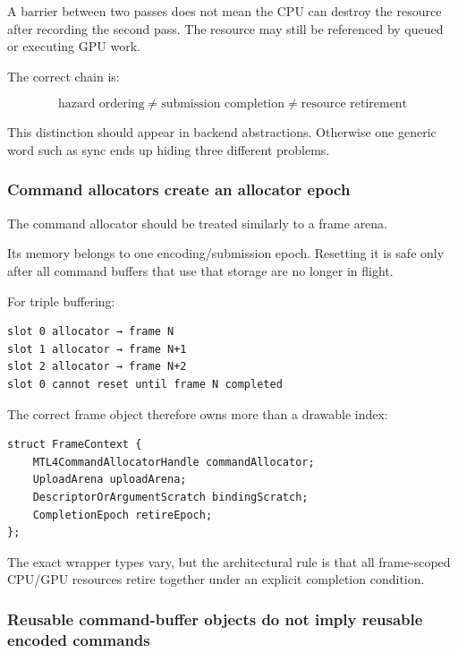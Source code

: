A barrier between two passes does not mean the CPU can destroy the resource after recording the second pass. The resource may still be referenced by queued or executing GPU work.

The correct chain is:

\[
\boxed{
\text{hazard ordering}
\neq
\text{submission completion}
\neq
\text{resource retirement}
}
\]

This distinction should appear in backend abstractions. Otherwise one generic word such as sync ends up hiding three different problems.

\subsubsection{Command allocators create an allocator epoch}\label{05-engine-i-ch022-command-allocators-create-an-allocator-epoch}

The command allocator should be treated similarly to a frame arena.

Its memory belongs to one encoding/submission epoch. Resetting it is safe only after all command buffers that use that storage are no longer in flight.

For triple buffering:

\begin{verbatim}
slot 0 allocator → frame N
slot 1 allocator → frame N+1
slot 2 allocator → frame N+2
slot 0 cannot reset until frame N completed
\end{verbatim}

The correct frame object therefore owns more than a drawable index:

\begin{verbatim}
struct FrameContext {
    MTL4CommandAllocatorHandle commandAllocator;
    UploadArena uploadArena;
    DescriptorOrArgumentScratch bindingScratch;
    CompletionEpoch retireEpoch;
};
\end{verbatim}

The exact wrapper types vary, but the architectural rule is that all frame-scoped CPU/GPU resources retire together under an explicit completion condition.

\subsubsection{Reusable command-buffer objects do not imply reusable encoded commands}\label{05-engine-i-ch022-reusable-command-buffer-objects-do-not-imply-reusable-encoded-commands}

